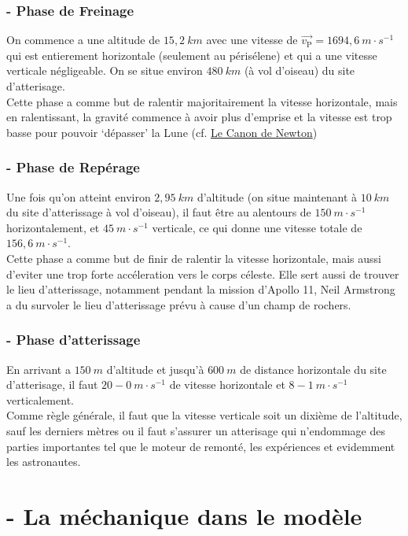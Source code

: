 \documentclass[a4paper, 12pt]{scrartcl}
\begin{document}
\subsubsection{- Phase de Freinage}
On commence a une altitude de $15,2\ km$ avec une vitesse de $\overrightarrow{v_{\text{P}}} = 1694,6\ m \cdot s^{-1}$ qui est entierement horizontale (seulement au périsélene) et qui a une vitesse 
verticale négligeable. On se situe environ $480\ km$ (à vol d'oiseau) du site d'atterisage.
\\
Cette phase a comme but de ralentir majoritairement la vitesse horizontale, 
mais en ralentissant, la gravité commence à avoir plus d'emprise 
et la vitesse est trop basse pour pouvoir `dépasser' la Lune (cf. \href{https://fr.wikipedia.org/wiki/Canon_de_Newton}{Le Canon de Newton})

\subsubsection{- Phase de Repérage}
Une fois qu'on atteint environ $2,95\ km$ d'altitude (on situe maintenant à $10\ km$ du site d'atterissage à vol d'oiseau), il faut être au alentours de $150\ m \cdot s^{-1}$
horizontalement, et $45\ m \cdot s^{-1}$ verticale, ce qui donne une vitesse totale de $156,6\ m \cdot s^{-1}$.
\\
Cette phase a comme but de finir de ralentir la vitesse horizontale, mais aussi d'eviter une trop
forte accéleration vers le corps céleste. Elle sert aussi de trouver le lieu d'atterissage, notamment pendant
la mission d'Apollo 11, Neil Armstrong a du survoler le lieu d'atterissage prévu à cause d'un
champ de rochers.

\subsubsection{- Phase d'atterissage}
En arrivant a $150\ m$ d'altitude et  jusqu'à $600\ m$ de distance horizontale du  
site d'atterisage, il faut $20-0\ m \cdot s^{-1}$ de vitesse horizontale et $8-1\ m \cdot s^{-1}$ verticalement.
\\
Comme règle générale, il faut que la vitesse verticale soit un dixième de l'altitude, sauf les derniers mètres ou il faut
s'assurer un atterisage qui n'endommage des parties importantes tel que le moteur de remonté, les expériences et evidemment les
astronautes. 



\newpage
\section{- La méchanique dans le modèle}
\end{document}
